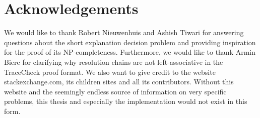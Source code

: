 \chapter*{Acknowledgements}
\vspace*{\fill}

We would like to thank Robert Nieuwenhuis and Ashish Tiwari for answering questions about the short explanation decision problem and providing inspiration for the proof of its NP-completeness. Furthermore, we would like to thank Armin Biere for clarifying why resolution chains are not left-associative in the TraceCheck proof format. We also want to give credit to the website stackexchange.com, its children sites and all its contributors. Without this website and the seemingly endless source of information on very specific problems, this thesis and especially the implementation would not exist in this form.
\vspace*{\fill}